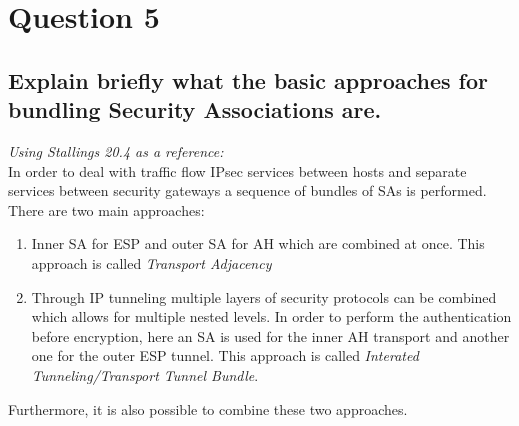 \documentclass{report}
\begin{document}
	\section{Question 5}
	\startsection
		\renewcommand{\thesubsection}{\thesection.\Alph{subsection}}
		\subsection{Explain briefly what the basic approaches for bundling Security Associations are.}
		\startsubsection
			\textit{Using Stallings 20.4 as a reference:} \\
			In order to deal with traffic flow IPsec services between hosts and separate services between security gateways a sequence of bundles of SAs is performed. There are two main approaches:
			\begin{enumerate}
				\item Inner SA for ESP and outer SA for AH which are combined at once. This approach is called \textit{Transport Adjacency}
				\item Through IP tunneling multiple layers of security protocols can be combined which allows for multiple nested levels. In order to perform the authentication before encryption, here an SA is used for the inner AH transport and another one for the outer ESP tunnel. This approach is called \textit{Interated Tunneling/Transport Tunnel Bundle}.
			\end{enumerate}
			Furthermore, it is also possible to combine these two approaches.
		\closesection
	\closesection
\end{document}
